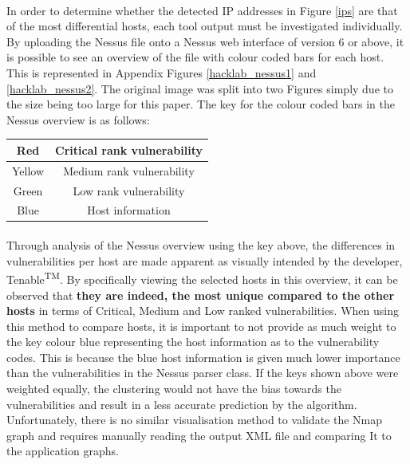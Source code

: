 \paragraph{}In order to determine whether the detected IP addresses in Figure \ref{ips} are that of the most differential hosts, each tool output must be investigated individually. By uploading the Nessus file onto a Nessus web interface of version 6 or above, it is possible to see an overview of the file with colour coded bars for each host. This is represented in Appendix Figures \ref{hacklab_nessus1} and \ref{hacklab_nessus2}. The original image was split into two Figures simply due to the size being too large for this paper. The key for the colour coded bars in the Nessus overview is as follows:
\begin{center}
\begin{tabular}{ |c|c| }
\hline
Red & Critical rank vulnerability\\ \hline
Yellow & Medium rank vulnerability\\ \hline
Green & Low rank vulnerability\\ \hline
Blue & Host information\\ \hline
\end{tabular}
\end{center}

\paragraph{}Through analysis of the Nessus overview using the key above, the differences in vulnerabilities per host are made apparent as visually intended by the developer, Tenable\textsuperscript{TM}. By specifically viewing the selected hosts in this overview, it can be observed that \textbf{they are indeed, the most unique compared to the other hosts} in terms of Critical, Medium and Low ranked vulnerabilities. When using this method to compare hosts, it is important to not provide as much weight to the key colour blue representing the host information as to the vulnerability codes. This is because the blue host information is given much lower importance than the vulnerabilities in the Nessus parser class. If the keys shown above were weighted equally, the clustering would not have the bias towards the vulnerabilities and result in a less accurate prediction by the algorithm. Unfortunately, there is no similar visualisation method to validate the Nmap graph and requires manually reading the output XML file and comparing It to the application graphs.

